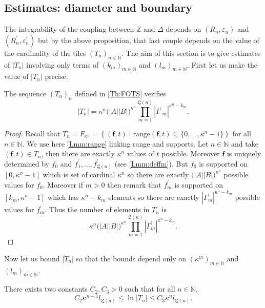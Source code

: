 \documentclass[english, 11pt, a4paper]{article}
\theoremstyle{definition}
\numberwithin{equation}{section}
\newcommand{\bN}{\mathbb{N}}
\newcommand{\bZ}{\mathbb{Z}}
\newcommand{\mbff}{\boldsymbol{f}}
\newcommand{\BZ}{\Delta}
\newcommand{\RZ}{R^\prime}
\newcommand{\epsZ}{\varepsilon^\prime}
\newcommand{\range}{\mathrm{range}}
\newcommand{\Landing}{\mathfrak{L}}
\newcommand{\CTn}{C_{3}}
\begin{document}
\subsection{Estimates: diameter and boundary}\label{Subsec:Estimates}
The integrability of the coupling between $\bZ$ and $\BZ$ depends on
$(R_n,\varepsilon_n)$ and $(\RZ_n,\epsZ_n)$ but by the above proposition, that last
couple depends on the value of the cardinality of the tiles $(T_n)_{n\in \bN}$.
The aim of this section is to give 
estimates of $|T_n|$ involving only terms of $(k_m)_{m\in \bN}$ and
$(l_m)_{m\in \bN}$.
First let us make the value of $|T_n|$ precise.
\begin{Lmm}\label{Lmm:CardTn}
  The sequence $(T_n)_n$ defined in \cref{Th:FOTS} verifies 
  \begin{equation*}
    |T_n|=\kappa^n \big( {|A| |B|} \big)^{\kappa^n}
    \prod^{\Landing(n)}_{m=1} {\left\vert {\Gamma^\prime}_m \right\vert}^{\kappa^{n}-k_m}.
  \end{equation*}
\end{Lmm}
\begin{proof}
  Recall that $T_n=F_{\kappa^n}=\left\{(\mbff, t) \mid \range
    \left(\mbff,t\right) \subseteq \{0, \ldots, \kappa^n-1\} \right\}$ for all
  $n\in \bN$. We use here \cref{Lmm:range} linking range and supports.
  Let $n\in \bN$ and take $(\mbff,t)\in T_n$, then there are exactly $\kappa^n$
  values of $t$ possible. Moreover $\mbff$ is uniquely determined by $f_0$ and
  $f^\prime_1, \ldots, f^\prime_{\Landing(n)}$ (see \cref{Lmm:deffm}). But $f_0$
  is supported on $[0,\kappa^n-1]$ which is set of cardinal $\kappa^n$ so  
  there are exactly $\big( {|A| |B|} \big)^{\kappa^n}$ possible values for
  $f_0$. Moreover if $m>0$ then remark that $f^\prime_m$ is supported on
  $[k_m,\kappa^n-1]$ which has
  $\kappa^n-k_m$ elements so there are exactly
  ${\left\vert \Gamma^\prime_m \right\vert}^{\kappa^n-k_m}$ possible values for
  $f^\prime_m$. Thus the number of elements in $T_n$ is
  \begin{equation*}
    {\kappa}^{n} \big( {|A| |B|} \big)^{\kappa^n}
    \prod^{\Landing(n)}_{m=1} {\left\vert \Gamma^\prime_m \right\vert}^{\kappa^n-k_m}.
  \end{equation*}
\end{proof}

Now let us bound $|T_n|$ so that the bounds depend only on $(\kappa^m)_{m\in \bN}$ and
$(l_m)_{m\in \bN}$.  

\begin{Prop}\label{Prop:EncadrementLogTn}
  There exists two constants $C_2, \CTn >0$ 
  such that for all $n \in \bN$,
  \begin{equation*}
    C_2 \kappa^{n-1}l_{\Landing(n)}\leq \ln |T_n| \leq \CTn \kappa^nl_{\Landing(n)}.
  \end{equation*}
\end{Prop}
\end{document}
